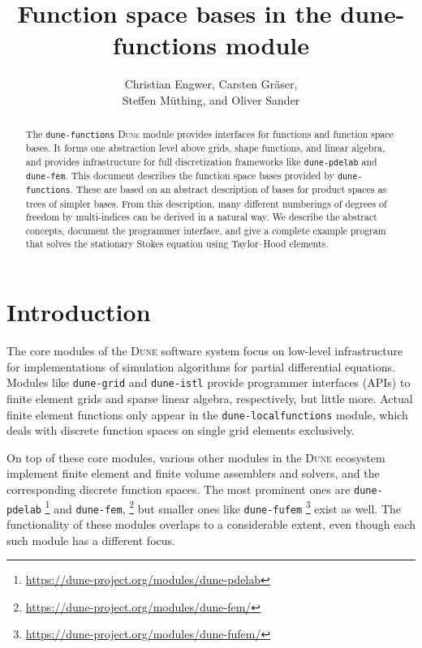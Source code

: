 \documentclass[a4paper,10pt,headings=normal,bibliography=totoc]{scrartcl}
\title{Function space bases in the dune-functions module}
\author{Christian Engwer, Carsten Gräser,\\ Steffen Müthing, and Oliver Sander}
\newcommand{\dune}{\textsc{Dune}\xspace}
\newcommand{\dunemodule}[1]{\texttt{#1}}
\begin{document}
\maketitle

\begin{abstract}
 The \dunemodule{dune-functions} \dune module provides interfaces for functions and function space bases.
 It forms one abstraction level above grids, shape functions, and linear algebra, and provides infrastructure
 for full discretization frameworks like \dunemodule{dune-pdelab} and \dunemodule{dune-fem}.
 This document describes the function space bases provided by \dunemodule{dune-functions}.  These are
 based on an abstract description of bases for product spaces as trees of simpler bases.
 From this description, many different numberings of degrees of freedom by multi-indices can be
 derived in a natural way. We describe the abstract concepts, document the programmer interface,
 and give a complete example program that solves the stationary Stokes equation using Taylor--Hood elements.
\end{abstract}

\section*{Introduction}

The core modules of the \dune software system focus on low-level infrastructure for
implementations of simulation algorithms for partial differential equations.  Modules like
\dunemodule{dune-grid} and \dunemodule{dune-istl} provide programmer interfaces (APIs) to finite element grids
and sparse linear algebra, respectively, but little more. Actual finite element functions only
appear in the \dunemodule{dune-localfunctions} module, which deals with discrete function spaces
on single grid elements exclusively.

On top of these core modules, various other modules in the \dune ecosystem implement finite element and finite volume assemblers
and solvers, and the corresponding discrete function spaces. The most prominent ones are
\dunemodule{dune-pdelab}%
\footnote{\url{https://dune-project.org/modules/dune-pdelab}}
%
and \dunemodule{dune-fem},%
\footnote{\url{https://dune-project.org/modules/dune-fem/}}
%
but smaller ones like \dunemodule{dune-fufem}%
\footnote{\url{https://dune-project.org/modules/dune-fufem/}}
%
exist as well.  The functionality of these modules overlaps to a considerable extent, even though
each such module has a different focus.
\end{document}
